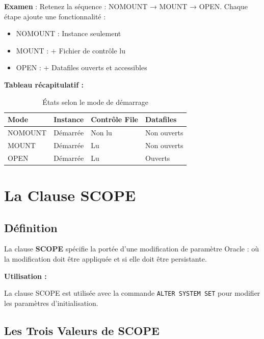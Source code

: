 \documentclass[11pt,a4paper]{article}
\begin{document}
\begin{tipbox}
\textbf{Examen} : Retenez la séquence : NOMOUNT → MOUNT → OPEN. Chaque étape ajoute une fonctionnalité :
\begin{itemize}
    \item NOMOUNT : Instance seulement
    \item MOUNT : + Fichier de contrôle lu
    \item OPEN : + Datafiles ouverts et accessibles
\end{itemize}
\end{tipbox}

\textbf{Tableau récapitulatif :}

\begin{table}[h]
\centering
\begin{tabular}{|l|l|l|l|}
\hline
\textbf{Mode} & \textbf{Instance} & \textbf{Contrôle File} & \textbf{Datafiles} \\
\hline
NOMOUNT & Démarrée & Non lu & Non ouverts \\
MOUNT & Démarrée & Lu & Non ouverts \\
OPEN & Démarrée & Lu & Ouverts \\
\hline
\end{tabular}
\caption{États selon le mode de démarrage}
\end{table}

\section{La Clause SCOPE}

\subsection{Définition}

\begin{definitionbox}
La clause \textbf{SCOPE} spécifie la portée d'une modification de paramètre Oracle : où la modification doit être appliquée et si elle doit être persistante.
\end{definitionbox}

\textbf{Utilisation :}

La clause SCOPE est utilisée avec la commande \texttt{ALTER SYSTEM SET} pour modifier les paramètres d'initialisation.

\subsection{Les Trois Valeurs de SCOPE}
\end{document}

